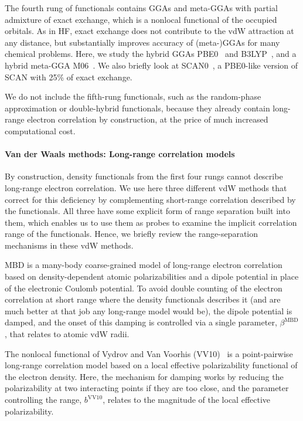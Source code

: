 The fourth rung of functionals contains GGAs and meta-GGAs with partial admixture of exact exchange, which is a nonlocal functional of the occupied orbitals.
As in HF, exact exchange does not contribute to the vdW attraction at any distance, but substantially improves accuracy of (meta-)GGAs for many chemical problems. %
Here, we study the hybrid GGAs PBE0~\cite{AdamoJCP99} and B3LYP~\cite{BeckeJCP93}, and a hybrid meta-GGA M06~\cite{ZhaoTCA08}.
We also briefly look at SCAN0~\cite{HuiJCP16}, a PBE0-like version of SCAN with 25\% of exact exchange.

We do not include the fifth-rung functionals, such as the random-phase approximation or double-hybrid functionals, because they already contain long-range electron correlation by construction, at the price of much increased computational cost.

\paragraph{Van der Waals methods: Long-range correlation models}

By construction, density functionals from the first four rungs cannot describe long-range electron correlation.
We use here three different vdW methods that correct for this deficiency by complementing short-range correlation described by the functionals.
All three have some explicit form of range separation built into them, which enables us to use them as probes to examine the implicit correlation range of the functionals.
Hence, we briefly review the range-separation mechanisms in these vdW methods.

MBD is a many-body coarse-grained model of long-range electron correlation based on density-dependent atomic polarizabilities and a dipole potential in place of the electronic Coulomb potential.
To avoid double counting of the electron correlation at short range where the density functionals describes it (and are much better at that job any long-range model would be), the dipole potential is damped, and the onset of this damping is controlled via a single parameter, $\beta^\text{MBD}$, that relates to atomic vdW radii.

The nonlocal functional of Vydrov and Van Voorhis (VV10)~\cite{VydrovJCP10a} is a point-pairwise long-range correlation model based on a local effective polarizability functional of the electron density.
Here, the mechanism for damping works by reducing the polarizability at two interacting points if they are too close, and the parameter controlling the range, $b^\text{VV10}$, relates to the magnitude of the local effective polarizability.

